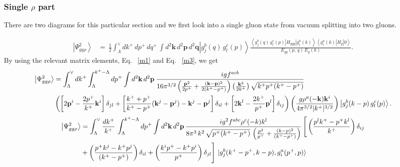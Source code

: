 \documentclass[aps,prd,amsmath,amssymb,nofootinbib]{revtex4-2}
\numberwithin{equation}{section}
\begin{document}
\subsubsection{Single $\rho$ part}
There are two diagrams for this particular section and we first look into a single gluon state from vacuum splitting into two gluons.
\begin{figure}[h]
\end{figure}
\begin{align}\label{ggtwo}
\left|\Psi_{gg\rho}^{2}\right\rangle & = \,\frac{1}{2}\int_{\Lambda}^{\vee}dk^{+}\, dp^{+}\, dq^{+}\,\int d^{2}\mathbf{k}\, d^{2}\mathbf{p}\, d^{2}\mathbf{q}\left|g_{j}^{b}(q)\, g_{l}^{c}(p)\right\rangle \frac{\left\langle g_{j}^{b}(q)\, g_{l}^{c}(p)\left|H_{ggg}\right|g_{i}^{a}(k)\right\rangle \left\langle g_{i}^{a}(k)\left|H_{g}\right|0\right\rangle }{E_{gg}(p,\, q)\, E_{g}(k)}.
\end{align}
By using the relevant matrix elements, Eq.~ \eqref{m1} and Eq.~ \eqref{m3}, we get
\begin{align}\label{ggmid}
\left|\Psi_{gg\rho}^{2}\right\rangle 
&=\int_{\Lambda}^{\vee}dk^{+}\int_{\Lambda}^{k^{+}-\Lambda}dp^{+}\int d^{2}\mathbf{k}\,d^{2}\mathbf{p}\:\frac{igf^{acb}}{16\pi^{3/2}\left(\frac{\mathbf{p}^{2}}{2p^{+}}+\frac{(\mathbf{k}-\mathbf{p})^{2}}{2(k^{+}-p^{+})}\right)\left(\frac{\mathbf{k}^{2}}{2k^{+}}\right)\sqrt{k^{+}p^{+}(k^{+}-p^{+})}}\notag \\ &
\left(\left[2\mathbf{p}^{i}-\frac{2p^{+}}{k^{+}}\mathbf{k}^{i}\right]\delta_{jl}+\left[\frac{k^{+}+p^{+}}{k^{+}-p^{+}}(\mathbf{k}^{j}-\mathbf{p}^{j})-\mathbf{k}^{j}-\mathbf{p}^{j}\right]\delta_{il}+\left[2\mathbf{k}^{l}-\frac{2k^{+}}{p^{+}}\mathbf{p}^{l}\right]\delta_{ij}\right)
\left(\frac{g\rho^{a}(-\mathbf{k})\mathbf{k}^{i}}{4\pi^{3/2}|k^{+}|^{3/2}}\right)\left|g_{j}^{b}(k-p)\, g_{l}^{c}(p)\right\rangle. 
\end{align}
\begin{align}
\left|\Psi_{gg\rho}^{2}\right\rangle 
&=\int_{\Lambda}^{\vee}\frac{dk^{+}}{k^{+}}\,\int_{\Lambda}^{k^{+}-\Lambda}dp^{+}\int d^{2}\mathbf{k}\,d^{2}\mathbf{p}\, \frac{ig^{2}f^{abc}\rho^{c}(-k)k^{l}}{8\pi^{3}\,k^{2}\,\sqrt{p^{+}(k^{+}-p^{+})}\,\left(\frac{p^{2}}{p^{+}}+\frac{(k-p)^{2}}{(k^{+}-p^{+})}\right)}\,\Bigg[\left(\frac{p^{l}k^{+}-p^{+}k^{l}}{k^{+}}\right)\delta_{ij}\notag \\ & +\left(\frac{p^{+}k^{j}-k^{+}p^{j}}{(k^{+}-p^{+})}\right)\delta_{il} +\left(\frac{k^{i}p^{+}-k^{+}p^{i}}{p^{+}}\right)\delta_{jl}\Bigg]\, \ket{g^{b}_{j}(k^{+}-p^{+}, k-p),g^{a}_{i}(p^{+},p)}
\end{align}
\end{document}

